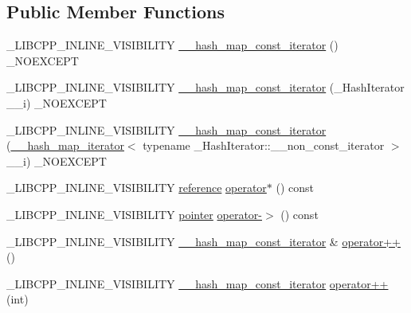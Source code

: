 \subsection*{Public Member Functions}
\begin{DoxyCompactItemize}
\item 
\+\_\+\+L\+I\+B\+C\+P\+P\+\_\+\+I\+N\+L\+I\+N\+E\+\_\+\+V\+I\+S\+I\+B\+I\+L\+I\+T\+Y \hyperlink{class____hash__map__const__iterator_a8901fc740c6c0594c3ef1b58a706bce0}{\+\_\+\+\_\+hash\+\_\+map\+\_\+const\+\_\+iterator} () \+\_\+\+N\+O\+E\+X\+C\+E\+P\+T
\item 
\+\_\+\+L\+I\+B\+C\+P\+P\+\_\+\+I\+N\+L\+I\+N\+E\+\_\+\+V\+I\+S\+I\+B\+I\+L\+I\+T\+Y \hyperlink{class____hash__map__const__iterator_a14aeb0ff1e45f6a666e9b79e3326f714}{\+\_\+\+\_\+hash\+\_\+map\+\_\+const\+\_\+iterator} (\+\_\+\+Hash\+Iterator \+\_\+\+\_\+i) \+\_\+\+N\+O\+E\+X\+C\+E\+P\+T
\item 
\+\_\+\+L\+I\+B\+C\+P\+P\+\_\+\+I\+N\+L\+I\+N\+E\+\_\+\+V\+I\+S\+I\+B\+I\+L\+I\+T\+Y \hyperlink{class____hash__map__const__iterator_a6c078738ef40183c8a60cbbae0926752}{\+\_\+\+\_\+hash\+\_\+map\+\_\+const\+\_\+iterator} (\hyperlink{class____hash__map__iterator}{\+\_\+\+\_\+hash\+\_\+map\+\_\+iterator}$<$ typename \+\_\+\+Hash\+Iterator\+::\+\_\+\+\_\+non\+\_\+const\+\_\+iterator $>$ \+\_\+\+\_\+i) \+\_\+\+N\+O\+E\+X\+C\+E\+P\+T
\item 
\+\_\+\+L\+I\+B\+C\+P\+P\+\_\+\+I\+N\+L\+I\+N\+E\+\_\+\+V\+I\+S\+I\+B\+I\+L\+I\+T\+Y \hyperlink{class____hash__map__const__iterator_a94a3447535fb67a3c48b0acded52fd84}{reference} \hyperlink{class____hash__map__const__iterator_a29b28fdb1a679d414a1f36f577af803c}{operator$\ast$} () const 
\item 
\+\_\+\+L\+I\+B\+C\+P\+P\+\_\+\+I\+N\+L\+I\+N\+E\+\_\+\+V\+I\+S\+I\+B\+I\+L\+I\+T\+Y \hyperlink{class____hash__map__const__iterator_a4bb73ff2685ed4941c03a85bf4248e90}{pointer} \hyperlink{class____hash__map__const__iterator_aab7c3eb3cdeaf1a4eb3e4508d3129515}{operator-\/$>$} () const 
\item 
\+\_\+\+L\+I\+B\+C\+P\+P\+\_\+\+I\+N\+L\+I\+N\+E\+\_\+\+V\+I\+S\+I\+B\+I\+L\+I\+T\+Y \hyperlink{class____hash__map__const__iterator}{\+\_\+\+\_\+hash\+\_\+map\+\_\+const\+\_\+iterator} \& \hyperlink{class____hash__map__const__iterator_a666dafa51ea2877d72be115e0a7bf8fe}{operator++} ()
\item 
\+\_\+\+L\+I\+B\+C\+P\+P\+\_\+\+I\+N\+L\+I\+N\+E\+\_\+\+V\+I\+S\+I\+B\+I\+L\+I\+T\+Y \hyperlink{class____hash__map__const__iterator}{\+\_\+\+\_\+hash\+\_\+map\+\_\+const\+\_\+iterator} \hyperlink{class____hash__map__const__iterator_adc8b42a6df32d9978e15e3c2107cafd4}{operator++} (int)

\end{DoxyCompactItemize}
